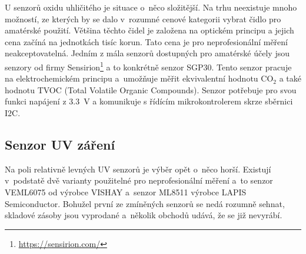 U senzorů oxidu uhličitého je situace o~něco složitější. Na trhu neexistuje mnoho možností, ze kterých by se dalo v~rozumné cenové kategorii vybrat čidlo pro amatérské použití. Většina těchto čidel je založena na optickém principu a jejich cena začíná na jednotkách tisíc korun. Tato cena je pro neprofesionální měření neakceptovatelná. Jedním z mála senzorů dostupných pro amatérské účely jsou senzory od firmy Sensirion\footnote{\url{https://sensirion.com/}} a to konkrétně senzor SGP30. Tento senzor pracuje na elektrochemickém principu a~umožňuje měřit ekvivalentní hodnotu CO$_2$ a také hodnotu TVOC (Total Volatile Organic Compounds). Senzor potřebuje pro svou funkci napájení z \SI{3.3}{\volt} a komunikuje s řídícím mikrokontrolerem skrze sběrnici I2C.



\subsection{Senzor UV záření}

Na poli relativně levných UV senzorů je výběr opět o~něco horší. Existují v~podstatě dvě varianty použitelné pro neprofesionální měření a~to senzor VEML6075 od výrobce VISHAY a~senzor ML8511 výrobce LAPIS Semiconductor. Bohužel první ze zmíněných senzorů se nedá rozumně sehnat, skladové zásoby jsou vyprodané a~několik obchodů udává, že se již nevyrábí.

